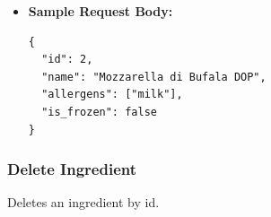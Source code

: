 \begin{itemize}[nosep]
\begin{itemize}[nosep]
\item Common auth errors: \texttt{401 Unauthorized}, \texttt{E4A2}; \texttt{403 Forbidden}, \texttt{E4A4}.
\item Common header errors: \texttt{E4V1}, \texttt{E4V2}, \texttt{E4V3}, \texttt{E4V4}.
\item \texttt{400 Bad Request}, \texttt{E4V6} - inner message \texttt{Missing required fields: name and isFrozen must be provided}
\item \texttt{400 Bad Request}, \texttt{E4V8} - inner message \texttt{Unexpected key in JSON: Unexpected field: <field>}
\item \texttt{404 Not Found}, \texttt{E4R2} - inner message \texttt{Ingredient with id 2 not found.}
\item \texttt{500 Internal Server Error}, \texttt{E5D1} - inner message \texttt{Database error while editing ingredient.}, inner details are the SQL exception message.
\item \texttt{500 Internal Server Error}, \texttt{E5G1} - malformed JSON syntax or invalid allergen enum values fall through to \texttt{Unable to serve the REST request: EDIT\_INGREDIENT.}
\end{itemize}

\item \textbf{Sample Request Body:}

\begin{lstlisting}
{
  "id": 2,
  "name": "Mozzarella di Bufala DOP",
  "allergens": ["milk"],
  "is_frozen": false
}
\end{lstlisting}
\end{itemize}

\subsubsection*{Delete Ingredient}

Deletes an ingredient by id.

